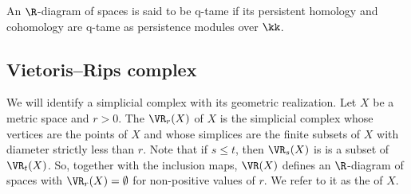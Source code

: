 An $\R$-diagram of spaces is said to be q-tame if its persistent homology and cohomology are q-tame as persistence modules over $\kk$.

%
%
%

\subsection{Vietoris--Rips complex}\label{ss:vietoris-rips}

We will identify a simplicial complex with its geometric realization.
Let $X$ be a metric space and $r > 0$.
The  $\VR_r(X)$ of $X$ is the simplicial complex whose vertices are the points of $X$ and whose simplices are the finite subsets of $X$ with diameter strictly less than $r$.
Note that if $s \leq t$, then $\VR_s(X)$ is is a subset of $\VR_t(X)$.
So, together with the inclusion maps, $\VR(X)$ defines an $\R$-diagram of spaces with $\VR_r(X) = \emptyset$ for non-positive values of $r$.
We refer to it as the  of $X$.

